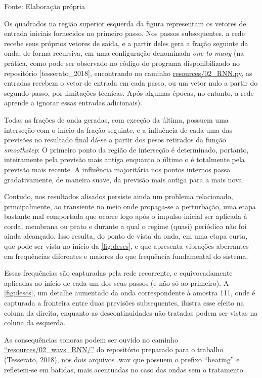 \documentclass[]{article}
\begin{document}
Fonte: Elaboração própria

Os quadrados na região superior esquerda da figura representam os
vetores de entrada iniciais fornecidos no primeiro passo. Nos passos
subsequentes, a rede recebe seus próprios vetores de saída, e a partir
deles gera a fração seguinte da onda, de forma recursiva, em uma
configuração denominada \emph{one-to-many} (na prática, como pode ser
observado no código do programa disponibilizado no repositório
{[}tesserato\_2018{]}, encontrando no caminho
\href{https://github.com/tesserato/tesserato.github.io/blob/master/resources/02_RNN.py}{resources/02\_RNN.py},
as entradas recebem o vetor de entrada em cada passo, ou um vetor nulo a
partir do segundo passo, por limitações técnicas. Após algumas épocas,
no entanto, a rede aprende a ignorar essas entradas adicionais).

Todas as frações de onda geradas, com exceção da última, possuem uma
interseção com o início da fração seguinte, e a influência de cada uma
das previsões no resultado final dá-se a partir dos pesos retirados da
função \emph{smoothstep}: O primeiro ponto da região de interseção é
determinado, portanto, inteiramente pela previsão mais antiga enquanto o
último o é totalmente pela previsão mais recente. A influência
majoritária nos pontos internos passa gradativamente, de maneira suave,
da previsão mais antiga para a mais nova.

Contudo, nos resultados alisados persiste ainda um problema relacionado,
principalmente, ao transiente no meio onde propaga-se a perturbação, uma
etapa bastante mal comportada que ocorre logo após o impulso inicial ser
aplicada à corda, membrana ou prato e durante a qual o regime (quasi)
periódico não foi ainda alcançado. Isso resulta, do ponto de vista da
onda, em uma etapa curta, que pode ser vista no início da
\cref{fig:descs}, e que apresenta vibrações aberrantes
em frequências diferentes e maiores do que frequência fundamental do
sistema.

Essas frequências são capturadas pela rede recorrente, e equivocadamente
aplicadas ao início de cada um dos seus passos (e não só ao primeiro). A
\cref{fig:descs}, um detalhe aumentado da onda
correspondente à amostra 111, onde é capturada a fronteira entre duas
previsões subsequentes, ilustra esse efeito na coluna da direita,
enquanto as descontinuidades não tratadas podem ser vistas na coluna da
esquerda.

As consequências sonoras podem ser ouvido no caminho
\href{https://github.com/tesserato/tesserato.github.io/tree/master/resources/02_wavs_RNN}{``resources/02\_wavs\_RNN/''}
do repositório preparado para o trabalho (Tesserato, 2018), nos dois
arquivos .wav que possuem o prefixo ``beating'' e refletem-se em
batidas, mais acentuadas no caso das ondas sem o tratamento.
\end{document}

